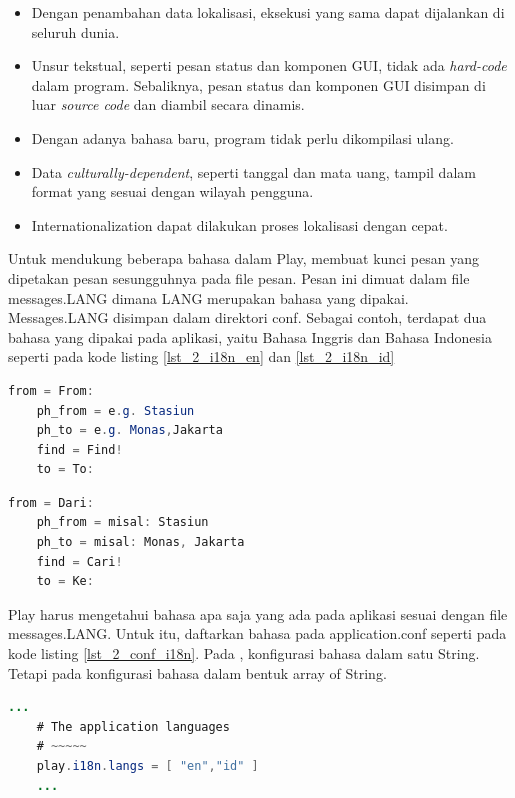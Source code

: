 \begin{itemize}
	\item Dengan penambahan data lokalisasi, eksekusi yang sama dapat dijalankan di seluruh dunia.
	\item Unsur tekstual, seperti pesan status dan komponen GUI, tidak ada \textit{hard-code} dalam program. Sebaliknya, pesan status dan komponen GUI disimpan di luar \textit{source code} dan diambil secara dinamis.
	\item Dengan adanya bahasa baru, program tidak perlu dikompilasi ulang.
	\item Data \textit{culturally-dependent}, seperti tanggal dan mata uang, tampil dalam format yang sesuai dengan wilayah pengguna.
	\item Internationalization dapat dilakukan proses lokalisasi dengan cepat.
\end{itemize}

Untuk mendukung beberapa bahasa dalam Play, membuat kunci pesan yang dipetakan pesan sesungguhnya pada file pesan. Pesan ini dimuat dalam file messages.LANG dimana LANG merupakan bahasa yang dipakai. Messages.LANG disimpan dalam direktori conf. Sebagai contoh, terdapat dua bahasa yang dipakai pada aplikasi, yaitu Bahasa Inggris dan Bahasa Indonesia seperti pada kode listing \ref{lst_2_i18n_en} dan \ref{lst_2_i18n_id}

\begin{lstlisting}[caption=Contoh messages.en untuk i18n,label = {lst_2_i18n_en},language=Java]
	from = From:
	ph_from = e.g. Stasiun
	ph_to = e.g. Monas,Jakarta
	find = Find!
	to = To:
\end{lstlisting}

\begin{lstlisting}[caption=Contoh messages.id untuk i18n,label = {lst_2_i18n_id},language=Java]
	from = Dari:
	ph_from = misal: Stasiun
	ph_to = misal: Monas, Jakarta
	find = Cari!
	to = Ke:
\end{lstlisting}

Play harus mengetahui bahasa apa saja yang ada pada aplikasi sesuai dengan file messages.LANG. Untuk itu, daftarkan bahasa pada application.conf seperti pada kode listing \ref{lst_2_conf_i18n}. Pada \cite{playforjava}, konfigurasi bahasa dalam satu String. Tetapi pada  konfigurasi bahasa dalam bentuk array of String.

\begin{lstlisting}[caption=Konfigurasi Bahasa i18n,label = {lst_2_conf_i18n},language=Java]
	...
	# The application languages
	# ~~~~~
	play.i18n.langs = [ "en","id" ]
	...
\end{lstlisting}

